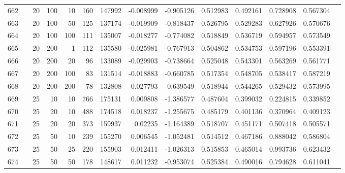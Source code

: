 \begin{longtable}{llrrrrrrrrrrrr}
		662 & &           20 &               100 &           10 &         160 &     147992 & -0.008999 & -0.905126 &  0.512983 &    0.492161 &       0.728908 &  0.567304 \\
		663 & &           20 &               100 &           50 &         125 &     137174 & -0.019909 & -0.818437 &  0.526795 &    0.529283 &       0.627926 &  0.570676 \\
		664 & &           20 &               100 &          100 &         111 &     135007 & -0.018277 & -0.774082 &  0.518849 &    0.536719 &       0.594957 &  0.573549 \\
		665 & &           20 &               200 &            1 &         112 &     135580 & -0.025981 & -0.767913 &  0.504862 &    0.534753 &       0.597196 &  0.553391 \\
		666 & &           20 &               200 &           20 &          96 &     133089 & -0.029903 & -0.738664 &  0.525048 &    0.543301 &       0.563269 &  0.561771 \\
		667 & &           20 &               200 &          100 &          83 &     131514 & -0.018883 & -0.660785 &  0.517354 &    0.548705 &       0.538417 &  0.587219 \\
		668 & &           20 &               200 &          200 &          78 &     132808 & -0.027793 & -0.639549 &  0.518944 &    0.544265 &       0.529432 &  0.573995 \\
		669 & &           25 &                10 &           10 &         766 &     175131 &  0.009808 & -1.386577 &  0.487604 &    0.399032 &       0.224815 &  0.339852 \\
		670 & &           25 &                20 &           10 &         488 &     174518 &  0.018237 & -1.255675 &  0.485179 &    0.401136 &       0.370964 &  0.409123 \\
		671 & &           25 &                20 &           20 &         373 &     159937 &   0.02235 & -1.164389 &  0.518707 &    0.451171 &       0.507418 &  0.505571 \\
		672 & &           25 &                50 &           10 &         239 &     155270 &  0.006545 & -1.052481 &  0.514512 &    0.467186 &       0.888042 &  0.586804 \\
		673 & &           25 &                50 &           25 &         220 &     155903 &  0.012411 & -1.026313 &  0.515853 &    0.465014 &       0.993736 &  0.623432 \\
		674 & &           25 &                50 &           50 &         178 &     148617 &  0.011232 & -0.953074 &  0.525384 &    0.490016 &       0.794628 &  0.611041 \\

\end{longtable}
